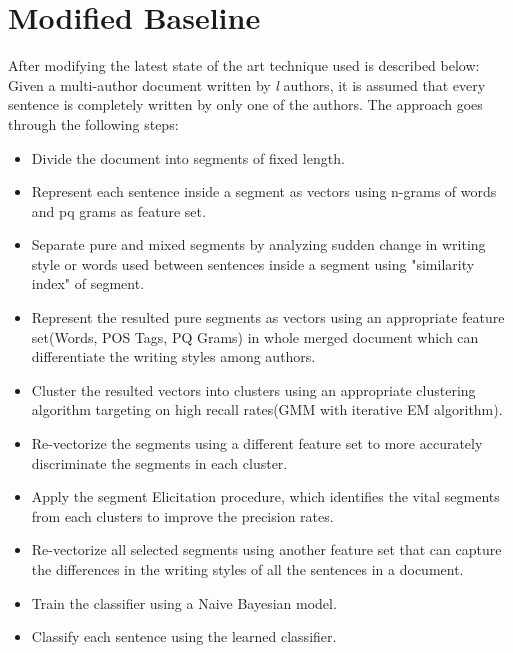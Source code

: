 \documentclass[letterpaper]{article}
\begin{document}

\section{Modified Baseline}
After modifying the latest state of the art technique used is described below:
Given a multi-author document written by \textit{l} authors, it is assumed that every sentence is completely written by only one of the authors. The approach goes through the following steps:
\begin{itemize}
\item Divide the document into segments of fixed length.
\item Represent each sentence inside a segment as vectors using n-grams of words and pq grams as feature set.
\item Separate pure and mixed segments by analyzing sudden change in writing style or words used between sentences inside a segment using "similarity index" of segment.
\item Represent the resulted pure segments as vectors using an appropriate feature set(Words, POS Tags, PQ Grams) in whole merged document which can differentiate the writing styles among authors.
\item Cluster the resulted vectors into  clusters using an appropriate clustering algorithm targeting on high recall rates(GMM with iterative EM algorithm).
\item Re-vectorize the segments using a different feature set to more accurately discriminate the segments in each cluster.
\item Apply the segment Elicitation procedure, which identifies the vital segments from each clusters to improve the precision rates.
\item Re-vectorize all selected segments using another feature set that can capture the differences in the writing styles of all the sentences in a document.
\item Train the classifier using a Naive Bayesian model.
\item Classify each sentence using the learned classifier.
\end{itemize}
\end{document}
